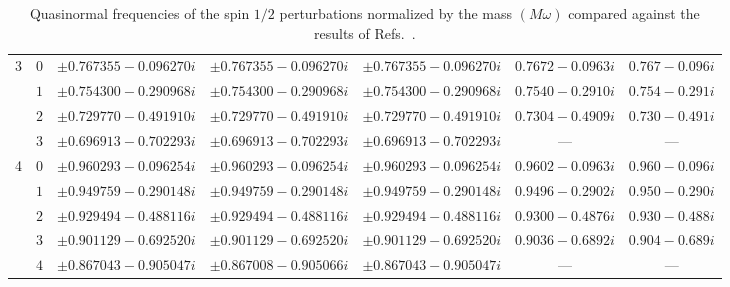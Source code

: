 \begin{table}[ht]
{\begin{tabular}{l |c|c|c|c|c|c}
      3   & $0$ & $\pm 0.767355 -0.096270 i$                & $\pm 0.767355 -0.096270 i$                 & $\pm 0.767355 -0.096270 i$ & $0.7672-0.0963 i$      & $0.767 -0.096i$        \\
          & $1$ & $\pm 0.754300 -0.290968 i$                & $\pm 0.754300 -0.290968 i$                 & $\pm 0.754300 -0.290968 i$ & $0.7540-0.2910 i$      & $0.754 -0.291i$        \\
          & $2$ & $\pm 0.729770 -0.491910 i$                & $\pm 0.729770 -0.491910 i$                 & $\pm 0.729770 -0.491910 i$ & $0.7304-0.4909 i$      & $0.730 -0.491i$        \\
          & $3$ & $\pm 0.696913 -0.702293 i$                & $\pm 0.696913 -0.702293 i$                 & $\pm 0.696913 -0.702293 i$ & ---                    & ---                    \\ \hline
      4   & $0$ & $\pm 0.960293 -0.096254 i$                & $\pm 0.960293 -0.096254 i$                 & $\pm 0.960293 -0.096254 i$ & $0.9602-0.0963 i$      & $0.960 -0.096i$        \\
          & $1$ & $\pm 0.949759 -0.290148 i$                & $\pm 0.949759 -0.290148 i$                 & $\pm 0.949759 -0.290148 i$ & $0.9496-0.2902 i$      & $0.950 -0.290i$        \\
          & $2$ & $\pm 0.929494 -0.488116 i$                & $\pm 0.929494 -0.488116 i$                 & $\pm 0.929494 -0.488116 i$ & $0.9300-0.4876 i$      & $0.930 -0.488i$        \\
          & $3$ & $\pm 0.901129 -0.692520 i$                & $\pm 0.901129 -0.692520 i$                 & $\pm 0.901129 -0.692520 i$ & $0.9036-0.6892 i$      & $0.904 -0.689i$        \\
          & $4$ & $\pm 0.867043 -0.905047 i$                & $\pm 0.867008 -0.905066 i$                 & $\pm 0.867043 -0.905047 i$ & ---                    & ---                    \\
      \hline\hline
    \end{tabular}%
  }
  \caption{
    Quasinormal frequencies of the spin $1/2$ perturbations normalized by the mass $(M\omega)$ compared against the results of Refs.~\cite{Cho:2003qe, Shu:2005fw}.
  }
  \label{Tab:Spin1/2}
\end{table}

